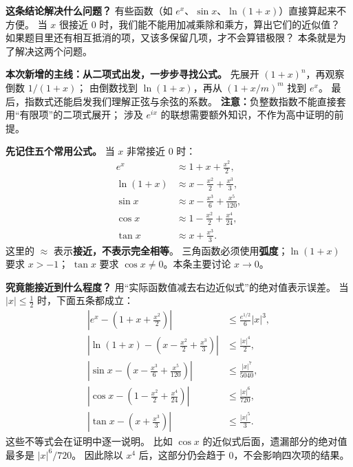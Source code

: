 \begin{statementbox}
\textbf{这条结论解决什么问题？}
有些函数（如 $e^x$、$\sin x$、$\ln(1+x)$）直接算起来不方便。
当 $x$ 很接近 $0$ 时，我们能不能用加减乘除和乘方，算出它们的近似值？
如果题目里还有相互抵消的项，又该多保留几项，才不会算错极限？
本条就是为了解决这两个问题。



\medskip
\textbf{本次新增的主线：从二项式出发，一步步寻找公式。}
先展开 $(1+x)^n$，再观察倒数 $1/(1+x)$；
由倒数找到 $\ln(1+x)$，再从 $(1+x/m)^m$ 找到 $e^x$。
最后，指数式还能启发我们理解正弦与余弦的系数。
\textbf{注意：}负整数指数不能直接套用“有限项”的二项式展开；
涉及 $e^{ix}$ 的联想需要额外知识，不作为高中证明的前提。

\begin{center}\end{center}
\end{statementbox}
\clearpage
\begin{statementbox}
\textbf{先记住五个常用公式。}
当 $x$ 非常接近 $0$ 时：
\[
\boxed{\begin{aligned}
 e^x&\approx1+x+\frac{x^2}{2},\\[2pt]
 \ln(1+x)&\approx x-\frac{x^2}{2}+\frac{x^3}{3},\\[2pt]
 \sin x&\approx x-\frac{x^3}{6}+\frac{x^5}{120},\\[2pt]
 \cos x&\approx1-\frac{x^2}{2}+\frac{x^4}{24},\\[2pt]
 \tan x&\approx x+\frac{x^3}{3}.
\end{aligned}}
\]
这里的 $\approx$ 表示\textbf{接近，不表示完全相等}。
三角函数必须使用\textbf{弧度}；$\ln(1+x)$ 要求 $x>-1$；
$\tan x$ 要求 $\cos x\ne0$。本条主要讨论 $x\to0$。

\textbf{究竟能接近到什么程度？}
用“实际函数值减去右边近似式”的绝对值表示误差。
当 $|x|\le\frac12$ 时，下面五条都成立：
\[
\begin{aligned}
 \left|e^x-\left(1+x+\frac{x^2}{2}\right)\right|
 &\le\frac{e^{1/2}}6|x|^3,\\
 \left|\ln(1+x)-\left(x-\frac{x^2}{2}+\frac{x^3}{3}\right)\right|
 &\le\frac{|x|^4}{2},\\
 \left|\sin x-\left(x-\frac{x^3}{6}+\frac{x^5}{120}\right)\right|
 &\le\frac{|x|^7}{5040},\\
 \left|\cos x-\left(1-\frac{x^2}{2}+\frac{x^4}{24}\right)\right|
 &\le\frac{|x|^6}{720},\\
 \left|\tan x-\left(x+\frac{x^3}{3}\right)\right|
 &\le\frac{|x|^5}{3}.
\end{aligned}
\]
这些不等式会在证明中逐一说明。
比如 $\cos x$ 的近似式后面，遗漏部分的绝对值最多是 $|x|^6/720$。
因此除以 $x^4$ 后，这部分仍会趋于 $0$，不会影响四次项的结果。
\end{statementbox}
